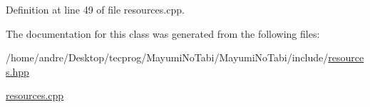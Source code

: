 Definition at line 49 of file resources.\-cpp.



The documentation for this class was generated from the following files\-:\begin{DoxyCompactItemize}
\item 
/home/andre/\-Desktop/tecprog/\-Mayumi\-No\-Tabi/\-Mayumi\-No\-Tabi/include/\hyperlink{resources_8hpp}{resources.\-hpp}\item 
\hyperlink{resources_8cpp}{resources.\-cpp}\end{DoxyCompactItemize}
